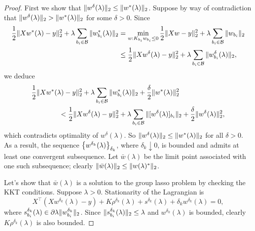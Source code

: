 \penConvergence*
\begin{proof}
    First we show that \( \|w^\delta(\lambda)\|_2 \leq \|w^*(\lambda)\|_2 \).
    Suppose by way of contradiction that
    \( \|w^\delta(\lambda)\|_2 > \|w^*(\lambda)\|_2 \)
    for some \( \delta > 0 \).
    Since
    \begin{align*}
        \frac 1 2 \|Xw^*(\lambda) - y\|_2^2
        + \lambda \sum_{{b_i} \in \mathcal{B}} \|w_{b_i}^*(\lambda)\|_2
         & =
        \min_{w : K_{{b_i}} w_{b_i} \leq 0} \frac 1 2 \|Xw - y\|_2^2
        + \lambda \sum_{{b_i} \in \mathcal{B}} \|w_{b_i}\|_2 \\
         & \leq
        \frac 1 2 \|Xw^\delta(\lambda) - y\|_2^2
        + \lambda \sum_{{b_i} \in \mathcal{B}} \|w_{b_i}^\delta(\lambda)\|_2,
    \end{align*}
    we deduce
    \begin{align*}
         & \frac 1 2 \|Xw^*(\lambda) - y\|_2^2
        + \lambda \sum_{{b_i} \in \mathcal{B}} \|w_{b_i}^*(\lambda)\|_2
        + \frac{\delta}{2} \|w^*(\lambda)\|_2^2 \\
         & \hspace{4em} <
        \frac 1 2 \|Xw^\delta(\lambda) - y\|_2^2
        + \lambda \sum_{{b_i} \in \mathcal{B}} \|[w^\delta(\lambda)]_{b_i}\|_2
        + \frac{\delta}{2} \|w^\delta(\lambda)\|_2^2,
    \end{align*}
    which contradicts optimality of \( w^\delta(\lambda) \).
    So \( \|w^\delta(\lambda)\|_2 \leq \|w^*(\lambda)\|_2 \)
    for all \( \delta > 0 \).
    As a result, the sequence
    \( \left\{w^{\delta_k}(\lambda)\right\}_{\delta_k} \), where \( \delta_k \downarrow 0 \),
    is bounded and admits at least one convergent subsequence.
    Let \( \bar w(\lambda) \) be the limit point associated with one
    such subsequence;
    clearly \( \|\bar w(\lambda)\|_2 \leq \|w(\lambda)^*\|_2 \).

    Let's show that \( \bar w(\lambda) \) is a solution to the group lasso
    problem by checking the KKT conditions.
    Suppose \( \lambda > 0 \).
    Stationarity of the Lagrangian is
    \[
        X^\top (Xw^{\delta_k}(\lambda) - y) + K \rho^{\delta_k}(\lambda) + s^{\delta_k}(\lambda) + \delta_k w^{\delta_k}(\lambda) = 0,
    \]
    where \( s_{b_i}^{\delta_k}(\lambda) \in \partial \lambda \|w_{b_i}^{\delta_k}\|_2 \).
    Since \( \|s_{b_i}^{\delta_k}(\lambda)\|_2 \leq \lambda \) and \( w^{\delta_k}(\lambda) \)
    is bounded, clearly \( K \rho^{\delta_k}(\lambda) \) is also bounded.


\end{proof}
